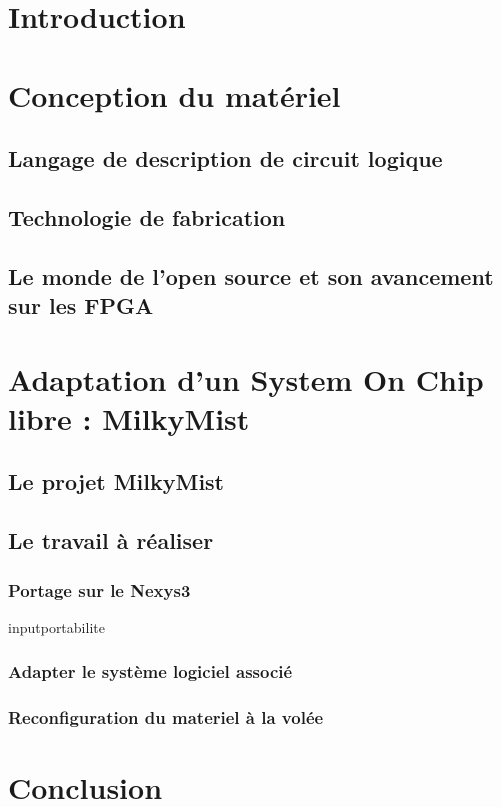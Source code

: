 \documentclass{report}
\begin{document}
\chapter*{Introduction} 


\chapter{Conception du matériel}

\section{Langage de description de circuit logique}  \newpage

\section{Technologie de fabrication} 

\section{Le monde de l'open source et son avancement sur les FPGA}
 \newpage

\chapter{Adaptation d'un System On Chip libre : MilkyMist} \newpage

\section{Le projet MilkyMist}  \newpage

\section{Le travail à réaliser}

\subsection{Portage sur le Nexys3}

input{portabilite} \newpage

\subsection{Adapter le système logiciel associé}

\newpage

\subsection{Reconfiguration du materiel à la volée}

\newpage

\chapter*{Conclusion}




\end{document}
